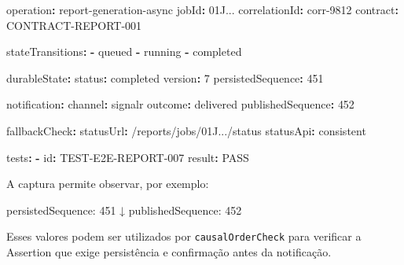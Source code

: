 \documentclass[
  10pt,
  a4paper,
  oneside]{book}
\newenvironment{Shaded}{}{}
\newcommand{\AttributeTok}[1]{\textcolor[rgb]{0.49,0.56,0.16}{#1}}
\newcommand{\DecValTok}[1]{\textcolor[rgb]{0.25,0.63,0.44}{#1}}
\newcommand{\FunctionTok}[1]{\textcolor[rgb]{0.02,0.16,0.49}{#1}}
\newcommand{\KeywordTok}[1]{\textcolor[rgb]{0.00,0.44,0.13}{\textbf{#1}}}
\newcommand{\NormalTok}[1]{#1}
\renewenvironment{Shaded}{\begin{snugshade}}{\end{snugshade}}%
\begin{document}
\begin{Shaded}
\begin{Highlighting}[]
\FunctionTok{operation}\KeywordTok{:}\AttributeTok{ report{-}generation{-}async}
\FunctionTok{jobId}\KeywordTok{:}\AttributeTok{ 01J...}
\FunctionTok{correlationId}\KeywordTok{:}\AttributeTok{ corr{-}9812}
\FunctionTok{contract}\KeywordTok{:}\AttributeTok{ CONTRACT{-}REPORT{-}001}

\FunctionTok{stateTransitions}\KeywordTok{:}
\AttributeTok{  }\KeywordTok{{-}}\AttributeTok{ queued}
\AttributeTok{  }\KeywordTok{{-}}\AttributeTok{ running}
\AttributeTok{  }\KeywordTok{{-}}\AttributeTok{ completed}

\FunctionTok{durableState}\KeywordTok{:}
\AttributeTok{  }\FunctionTok{status}\KeywordTok{:}\AttributeTok{ completed}
\AttributeTok{  }\FunctionTok{version}\KeywordTok{:}\AttributeTok{ }\DecValTok{7}
\AttributeTok{  }\FunctionTok{persistedSequence}\KeywordTok{:}\AttributeTok{ }\DecValTok{451}

\FunctionTok{notification}\KeywordTok{:}
\AttributeTok{  }\FunctionTok{channel}\KeywordTok{:}\AttributeTok{ signalr}
\AttributeTok{  }\FunctionTok{outcome}\KeywordTok{:}\AttributeTok{ delivered}
\AttributeTok{  }\FunctionTok{publishedSequence}\KeywordTok{:}\AttributeTok{ }\DecValTok{452}

\FunctionTok{fallbackCheck}\KeywordTok{:}
\AttributeTok{  }\FunctionTok{statusUrl}\KeywordTok{:}\AttributeTok{ /reports/jobs/01J.../status}
\AttributeTok{  }\FunctionTok{statusApi}\KeywordTok{:}\AttributeTok{ consistent}

\FunctionTok{tests}\KeywordTok{:}
\AttributeTok{  }\KeywordTok{{-}}\AttributeTok{ }\FunctionTok{id}\KeywordTok{:}\AttributeTok{ TEST{-}E2E{-}REPORT{-}007}
\AttributeTok{    }\FunctionTok{result}\KeywordTok{:}\AttributeTok{ PASS}
\end{Highlighting}
\end{Shaded}

A captura permite observar, por exemplo:

\begin{Shaded}
\begin{Highlighting}[]
\NormalTok{persistedSequence: 451}
\NormalTok{        ↓}
\NormalTok{publishedSequence: 452}
\end{Highlighting}
\end{Shaded}

Esses valores podem ser utilizados por \texttt{causalOrderCheck} para
verificar a Assertion que exige persistência e confirmação antes da
notificação.
\end{document}
